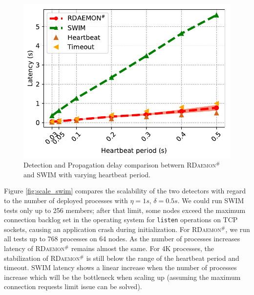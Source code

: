 \documentclass[sigconf]{acmart}
\newcommand{\ourwork}[0]{\textsc{RDaemon}\ensuremath{^\#}\xspace}
\begin{document}
\begin{figure}[h]
  \centering
  \includegraphics[width=\linewidth]{HB_prrte_swim.pdf}
  \caption{Detection and Propagation delay comparison betwern \ourwork and SWIM with varying heartbeat period.}
  \label{fig:hb_prrte_swim}
\end{figure}


Figure \ref{fig:scale_swim} compares the scalability of the two detectors with regard to the number of deployed processes with $\eta = 1s$, $\delta = 0.5s$.
We could run SWIM tests only up to 256 members; after that limit, some nodes exceed the maximum connection backlog
set in the operating system for \texttt{listen} operations on TCP sockets, causing an application crash during
initialization. For \ourwork,
we run all tests up to 768 processes on 64 nodes.
%
As the number of processes increases latency of \ourwork remains almost the same.
For 4K processes, the stabilization of \ourwork is still below the range of the heartbeat period and timeout.
SWIM latency shows a linear increase when the number of processes increase which will be the bottleneck when scaling up (assuming the maximum connection requests limit issue can be solved).
\end{document}
